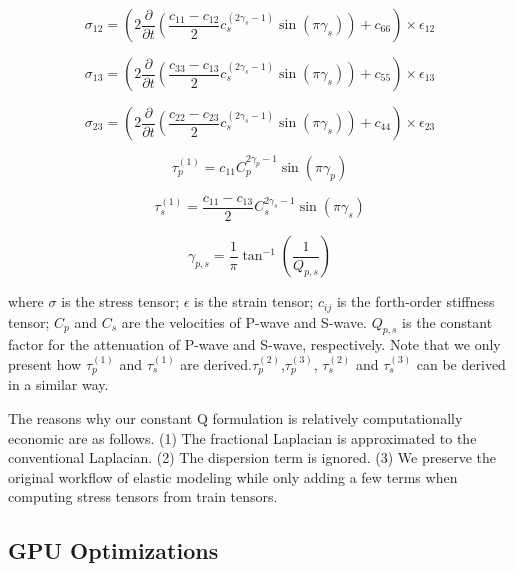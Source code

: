 \documentclass{paris17}
\begin{document}
\begin{equation}
  \sigma_{12} = \left ( 2\frac{\partial}{\partial t} \left( \frac{c_{11}-c_{12}}{2}c_s^{(2\gamma_s-1)}\sin(\pi\gamma_s) \right) + c_{66} \right )\times \epsilon_{12}
\end{equation}

\begin{equation}
  \sigma_{13} = \left ( 2\frac{\partial}{\partial t} \left( \frac{c_{33}-c_{13}}{2}c_s^{(2\gamma_s-1)}\sin(\pi\gamma_s) \right) + c_{55} \right )\times \epsilon_{13}
\end{equation}

\begin{equation}
  \sigma_{23} = \left ( 2\frac{\partial}{\partial t} \left( \frac{c_{22}-c_{23}}{2}c_s^{(2\gamma_s-1)}\sin(\pi\gamma_s) \right) + c_{44} \right )\times \epsilon_{23}
\end{equation}

\begin{equation}
  \tau_p^{(1)} = c_{11}C_p^{2\gamma_p - 1}\sin(\pi \gamma_p)
\end{equation}

\begin{equation}
  \tau_s^{(1)} = \frac{c_{11} - c_{13}}{2}C_s^{2\gamma_s - 1}\sin(\pi \gamma_s)
\end{equation}

\begin{equation}
  \gamma_{p,s}=\frac{1}{\pi}\tan^{-1}(\frac{1}{Q_{p,s}})
\end{equation}

where $\sigma$ is the stress tensor; $\epsilon$ is the strain tensor; $c_{ij}$ is the forth-order stiffness tensor; $C_p$ and $C_s$ are the velocities of P-wave and S-wave. $Q_{p,s}$ is the constant factor for the attenuation of P-wave and S-wave, respectively. Note that we only present how $\tau_p^{(1)}$ and $\tau_s^{(1)}$ are derived$. \tau_p^{(2)}$,$\tau_p^{(3)}$, $\tau_s^{(2)}$ and $\tau_s^{(3)}$ can be derived in a similar way.

The reasons why our constant Q formulation is relatively computationally economic are as follows. (1) The fractional Laplacian is approximated to the conventional Laplacian. (2) The dispersion term is ignored. (3) We preserve the original workflow of elastic modeling while only adding a few terms when computing stress tensors from train tensors.

\subsection{GPU Optimizations}
\end{document}
